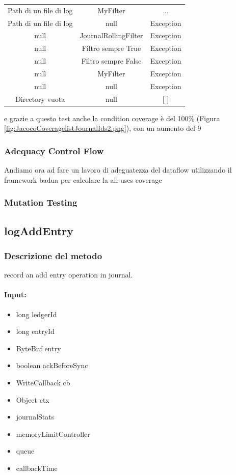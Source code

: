 \documentclass[12pt, a4paper]{article}
\begin{document}
\begin{table}[ht]
\begin{tabular}{|c|c|c|}
  {Path di un file di log} & MyFilter & ... \\
  {Path di un file di log} & null & Exception \\
  null & JournalRollingFilter & Exception \\
  null & Filtro sempre True & Exception \\
  null & Filtro sempre False & Exception \\
  null & MyFilter & Exception \\
  null & null & Exception \\
  {Directory vuota} & null & [ ] \\
  \hline
  \end{tabular}
  \end{table}

e grazie a questo test anche la condition coverage è del 100\% (Figura \ref{fig:JacocoCoveragelistJournalIds2.png}),
 con un aumento del 9%

 \subsubsection{Adequacy Control Flow}

 Andiamo ora ad fare un lavoro di adeguatezza del dataflow utilizzando il framework badua per calcolare la all-uses coverage

 \subsubsection{Mutation Testing}




















\subsection{logAddEntry}
\subsubsection{Descrizione del metodo}
record an add entry operation in journal.
\paragraph{Input:}
\begin{itemize}
  \item long ledgerId
  \item long entryId
  \item ByteBuf entry
  \item boolean ackBeforeSync
  \item WriteCallback cb
  \item Object ctx
  \item journalStats
  \item memoryLimitController
  \item queue
  \item callbackTime
\end{itemize}
\end{document}
